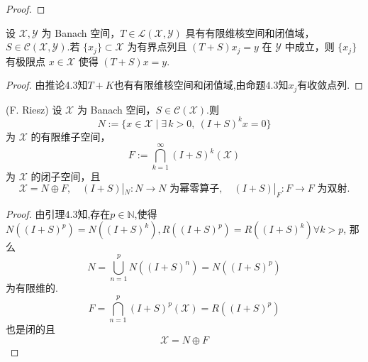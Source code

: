 \documentclass[lang=cn,newtx,10pt,scheme=chinese,thmcnt=chapter]{elegantbook}
\begin{document}
\begin{problemset}
\begin{proof}
\end{proof}
  \item 设 \(\mathcal{X},\mathcal{Y}\) 为 Banach 空间，\(T \in  \mathcal{L}\left( {\mathcal{X},\mathcal{Y}}\right)\) 具有有限维核空间和闭值域，\(S \in  \mathcal{C}\left( {\mathcal{X},\mathcal{Y}}\right)\).若 \(\{x_{j}\} \subset  \mathcal{X}\) 为有界点列且 \((T + S)x_{j} = y\) 在 \(\mathcal{Y}\) 中成立，则 \(\{x_{j}\}\) 有极限点 \(x \in  \mathcal{X}\) 使得 \((T + S)x = y\).
\begin{proof}
    由推论4.3知$T+K$也有有限维核空间和闭值域,由命题4.3知$x_j$有收敛点列.
\end{proof}
  \item (F. Riesz) 设 \(\mathcal{X}\) 为 Banach 空间，\(S \in  \mathcal{C}\left( \mathcal{X}\right)\).则\[
  N := \{ x \in  \mathcal{X} \mid  \exists\, k > 0,\ {\left( I + S\right)}^{k}x = 0\}
  \]
  为 \(\mathcal{X}\) 的有限维子空间，  \[
  F := \bigcap_{k = 1}^{\infty }{\left( I + S\right)}^{k}\left( \mathcal{X}\right)
  \]
  为 \(\mathcal{X}\) 的闭子空间，且
\[
  \mathcal{X} = N \oplus  F,\quad
  (I + S)|_{N}:N \to N \text{ 为幂零算子},\quad
  (I + S)|_{F}:F \to F \text{ 为双射}.
  \]
\begin{proof}
    由引理4.3知,存在$p\in \mathbb{N}$,使得$N((I+S)^p)=N((I+S)^k),R((I+S)^p)=R((I+S)^k)\forall k>p$,
    那么\[N=\bigcup\limits_{n=1}^pN\left(\left(I+S\right)^n\right)=N((I+S)^p)\]
    为有限维的.
\[  F = \bigcap_{n = 1}^{p }{\left( I + S\right)}^{p}\left( \mathcal{X}\right)=R((I+S)^p)\]
也是闭的且\[\mathcal{X}=N\oplus F\]


\end{proof}
\end{problemset}
\end{document}
